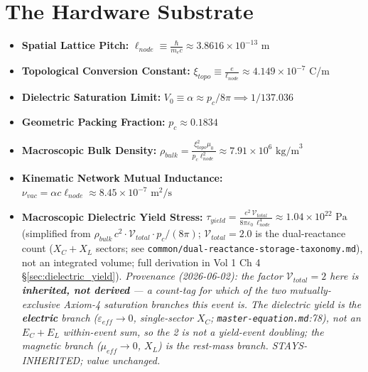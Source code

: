 \section{The Hardware Substrate}
\begin{itemize}
    \item \textbf{Spatial Lattice Pitch:} $\ell_{node} \equiv \frac{\hbar}{m_e c} \approx 3.8616 \times 10^{-13}$ m
    \item \textbf{Topological Conversion Constant:} $\xi_{topo} \equiv \frac{e}{\ell_{node}} \approx 4.149 \times 10^{-7}$ C/m
    \item \textbf{Dielectric Saturation Limit:} $V_0 \equiv \alpha \approx p_c / 8\pi \implies 1/137.036$
    \item \textbf{Geometric Packing Fraction:} $p_c \approx 0.1834$
    \item \textbf{Macroscopic Bulk Density:} $\rho_{bulk} = \frac{\xi_{topo}^2 \mu_0}{p_c \ell_{node}^2} \approx 7.91 \times 10^6 \text{ kg/m}^3$
    \item \textbf{Kinematic Network Mutual Inductance:} $\nu_{vac} = \alpha c \ell_{node} \approx 8.45 \times 10^{-7} \text{ m}^2/\text{s}$
    \item \textbf{Macroscopic Dielectric Yield Stress:} $\tau_{yield} = \frac{e^2\, \mathcal{V}_{total}}{8\pi \varepsilon_0\, \ell_{node}^4} \approx 1.04 \times 10^{22}\text{ Pa}$
          \quad (simplified from $\rho_{bulk}\, c^2 \cdot \mathcal{V}_{total} \cdot p_c/(8\pi)$; $\mathcal{V}_{total} = 2.0$ is the dual-reactance count ($X_C + X_L$ sectors; see \texttt{common/dual-reactance-storage-taxonomy.md}), not an integrated volume; full derivation in Vol 1 Ch 4 \S\ref{sec:dielectric_yield}). \emph{Provenance (2026-06-02): the factor $\mathcal{V}_{total} = 2$ here is \textbf{inherited, not derived} --- a count-tag for \emph{which} of the two mutually-exclusive Axiom-4 saturation branches this event is. The dielectric yield is the \textbf{electric} branch ($\varepsilon_{eff} \to 0$, single-sector $X_C$; \texttt{master-equation.md}:78), not an $E_C + E_L$ within-event sum, so the 2 is not a yield-event doubling; the magnetic branch ($\mu_{eff} \to 0$, $X_L$) is the rest-mass branch. STAYS-INHERITED; value unchanged.}
\end{itemize}


